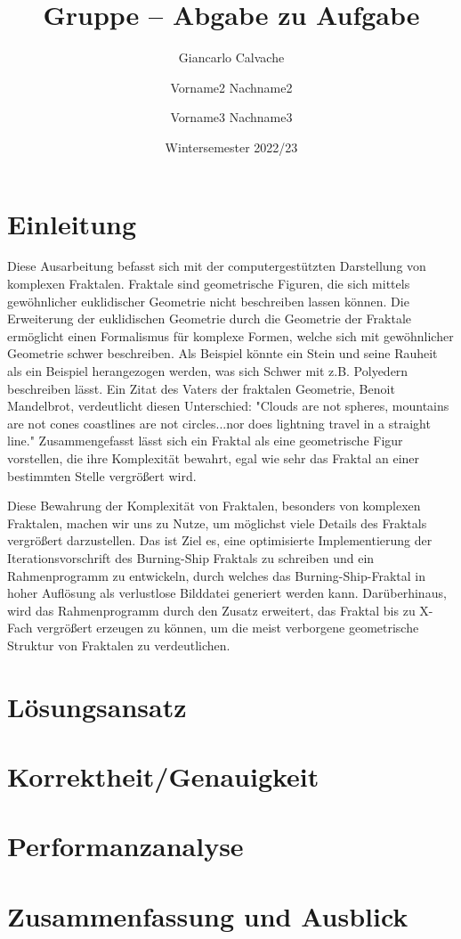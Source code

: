 \documentclass[course=erap]{aspdoc}
\author{Giancarlo Calvache \and Vorname2 Nachname2 \and Vorname3 Nachname3}
\date{Wintersemester 2022/23} %
\title{Gruppe \theGroup{} -- Abgabe zu Aufgabe \theNumber}
\begin{document}
\maketitle

\section{Einleitung}

Diese Ausarbeitung befasst sich mit der computergestützten Darstellung von komplexen Fraktalen.
Fraktale sind geometrische Figuren, die sich mittels gewöhnlicher euklidischer Geometrie nicht beschreiben lassen können.
Die Erweiterung der euklidischen Geometrie durch die Geometrie der Fraktale ermöglicht einen Formalismus für komplexe Formen, welche sich mit
gewöhnlicher Geometrie schwer beschreiben. Als Beispiel könnte ein Stein und seine Rauheit als ein Beispiel herangezogen werden, was sich Schwer mit
z.B. Polyedern beschreiben lässt.
Ein Zitat des Vaters der fraktalen Geometrie, Benoit Mandelbrot, verdeutlicht diesen Unterschied: "Clouds are not spheres, mountains are not cones
coastlines are not circles...nor does lightning travel in a straight line."
Zusammengefasst lässt sich ein Fraktal als eine geometrische Figur vorstellen, die ihre Komplexität bewahrt,
egal wie sehr das Fraktal an einer bestimmten Stelle vergrößert wird. 

Diese Bewahrung der Komplexität von Fraktalen, besonders von komplexen Fraktalen, machen wir uns zu Nutze, um möglichst viele Details des Fraktals vergrößert darzustellen.
Das ist Ziel es, eine optimisierte Implementierung der Iterationsvorschrift des Burning-Ship Fraktals zu schreiben und ein Rahmenprogramm zu entwickeln,
durch welches das Burning-Ship-Fraktal in hoher Auflösung als verlustlose Bilddatei generiert werden kann. Darüberhinaus, wird das Rahmenprogramm durch den
Zusatz erweitert, das Fraktal bis zu X-Fach vergrößert erzeugen zu können, um die meist verborgene geometrische Struktur von Fraktalen zu verdeutlichen.

\section{Lösungsansatz}


\section{Korrektheit/Genauigkeit}


\section{Performanzanalyse}


\section{Zusammenfassung und Ausblick}


{}
\end{document}
